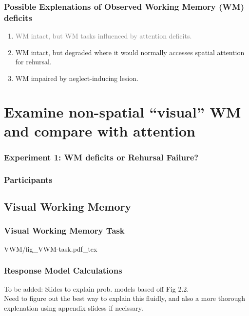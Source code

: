\documentclass{beamer}
\begin{document}
\begin{frame}
	\frametitle{Possible Explenations of Observed Working Memory (WM) deficits}
	\begin{enumerate}
		\item \textcolor{gray}{WM intact, but WM tasks influenced by attention deficits.}
		\item WM intact, but degraded where it would normally accesses spatial attention for rehursal.
		\item WM impaired by neglect-inducing lesion.
	\end{enumerate}
\end{frame}


\section[Attention and WM]{Examine non-spatial ``visual'' WM and compare with attention}

\begin{frame}
	\frametitle{Experiment 1: WM deficits or Rehursal Failure?}
		\tableofcontents[currentsection]
\end{frame}

\begin{frame}
\frametitle{Participants}

\end{frame}

\subsection*{Visual Working Memory}

\begin{frame}
	\frametitle{Visual Working Memory Task}
	\def\svgwidth{\textwidth}
	{VWM/fig_VWM-task.pdf_tex}
\end{frame}

\begin{frame}
	\frametitle{Response Model Calculations}
	To be added: Slides to explain prob. models based off Fig 2.2.\\
	Need to figure out the best way to explain this fluidly, and also a more thorough
	explenation using appendix slidess if necissary.
\end{frame}
\end{document}

